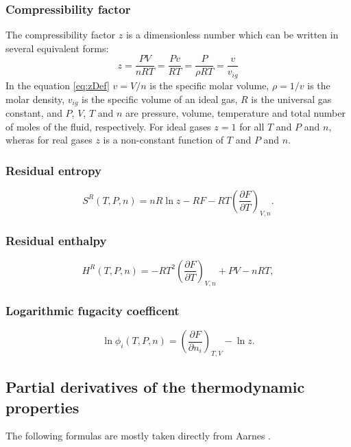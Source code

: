 \documentclass[internal,english]{sintefmemo2012}
\newcommand{\dd}[2]{\frac{\partial #1}{\partial #2}}
\newcommand{\lp}{\left(}
\newcommand{\rp}{\right)}
\numberwithin{equation}{section}
\begin{document}
\subsubsection*{Compressibility factor}
\noindent
The compressibility factor $z$ is a dimensionless number which can be
written in several equivalent forms:
\begin{equation}
  \label{eq:zDef}
  z = \frac{PV}{nRT} = \frac{Pv}{RT} = \frac{P}{\rho RT}  = \frac{v}{v_{ig}}
\end{equation}
In the equation \eqref{eq:zDef} $v = V /n$ is the specific molar
volume, $\rho = 1/v$ is the molar density, $v_{ig}$ is the specific
volume of an ideal gas, $R$ is the universal gas constant, and $P$,
$V$, $T$ and $n$ are pressure, volume, temperature and total number of
moles of the fluid, respectively. For ideal gases $z=1$ for all $T$
and $P$ and $n$, wheras for real gases $z$ is a non-constant function
of $T$ and $P$ and $n$.

\subsubsection*{Residual entropy}
\begin{equation}
  \label{eq:Sres}
  S^R(T,P,n) = nR \ln z - RF - RT \lp \dd{F}{T} \rp_{V,n}. %
\end{equation}

\subsubsection*{Residual enthalpy}
\begin{equation}
  \label{eq:Hreduced}
  H^R(T,P,n) = -RT^2 \lp \dd{F}{T} \rp_{V,n} + PV - nRT, %
\end{equation}

\subsubsection*{Logarithmic fugacity coefficent}
\begin{equation}
  \label{eq:lnphireduced}
  \ln \phi_i(T,P,n) = \lp \dd{F}{n_i} \rp_{T,V} - \ln z. %
\end{equation}

\subsection{Partial derivatives of the thermodynamic properties}
The following formulas are mostly taken directly from Aarnes
\cite{Aarnes13}.
\end{document}
